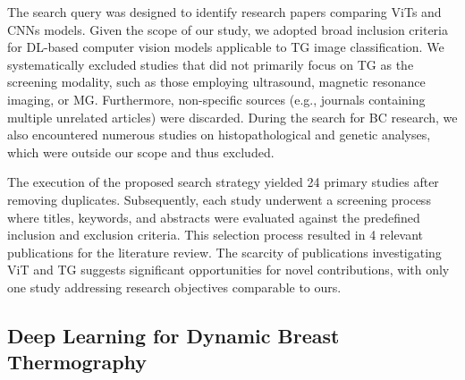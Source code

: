 \documentclass[runningheads]{llncs}
\begin{document}
The search query was designed to identify research papers comparing
\ac{ViTs} and \ac{CNNs} models. Given the scope of our study, we
adopted broad inclusion criteria for \ac{DL}-based computer vision
models applicable to \ac{TG} image classification. We systematically
excluded studies that did not primarily focus on \ac{TG} as the
screening modality, such as those employing ultrasound, magnetic
resonance imaging, or \ac{MG}. Furthermore, non-specific sources
(e.g., journals containing multiple unrelated articles) were
discarded. During the search for \ac{BC} research, we also encountered
numerous studies on histopathological and genetic analyses, which were
outside our scope and thus excluded.

The execution of the proposed search strategy yielded 24 primary
studies after removing duplicates. Subsequently, each study underwent
a screening process where titles, keywords, and abstracts were
evaluated against the predefined inclusion and exclusion
criteria. This selection process resulted in 4 relevant publications
for the literature review. The scarcity of publications investigating
\ac{ViT} and \ac{TG} suggests significant opportunities for novel
contributions, with only one study \cite{Garia2023} addressing
research objectives comparable to ours.

\subsection{Deep Learning for Dynamic Breast Thermography}
\label{sec:related-works-1}

\end{document}
